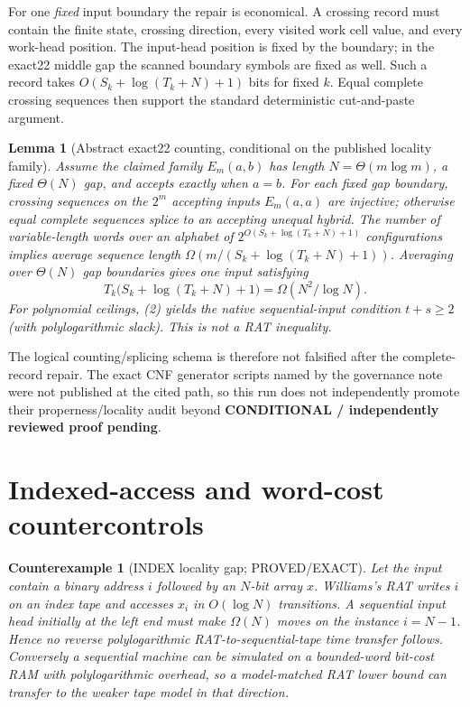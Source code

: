 \documentclass[11pt]{article}
\newtheorem{lemma}[theorem]{Lemma}
\newtheorem{counterexample}[theorem]{Counterexample}
\begin{document}
For one \emph{fixed} input boundary the repair is economical.  A crossing
record must contain the finite state, crossing direction, every visited work
cell value, and every work-head position.  The input-head position is fixed
by the boundary; in the exact22 middle gap the scanned boundary symbols are
fixed as well.  Such a record takes $O(S_k+\log(T_k+N)+1)$ bits for fixed $k$.
Equal complete crossing sequences then support the standard deterministic
cut-and-paste argument.

\begin{lemma}[Abstract exact22 counting, conditional on the published locality
family]
Assume the claimed family $E_m(a,b)$ has length $N=\Theta(m\log m)$, a fixed
$\Theta(N)$ gap, and accepts exactly when $a=b$.  For each fixed gap boundary,
crossing sequences on the $2^m$ accepting inputs $E_m(a,a)$ are injective;
otherwise equal complete sequences splice to an accepting unequal hybrid.
The number of variable-length words over an alphabet of
$2^{O(S_k+\log(T_k+N)+1)}$ configurations implies average sequence length
$\Omega(m/(S_k+\log(T_k+N)+1))$.  Averaging over $\Theta(N)$ gap boundaries
gives one input satisfying
\[
 T_k\bigl(S_k+\log(T_k+N)+1\bigr)=\Omega(N^2/\log N).
\tag{2}
\]
For polynomial ceilings, (2) yields the native sequential-input condition
$t+s\ge2$ (with polylogarithmic slack).  This is not a RAT inequality.
\end{lemma}

The logical counting/splicing schema is therefore not falsified after the
complete-record repair.  The exact CNF generator scripts named by the
governance note were not published at the cited path, so this run does not
independently promote their properness/locality audit beyond
\textbf{CONDITIONAL / independently reviewed proof pending}.

\section{Indexed-access and word-cost countercontrols}
\begin{counterexample}[INDEX locality gap; PROVED/EXACT]
Let the input contain a binary address $i$ followed by an $N$-bit array $x$.
Williams's RAT writes $i$ on an index tape and accesses $x_i$ in
$O(\log N)$ transitions.  A sequential input head initially at the left end
must make $\Omega(N)$ moves on the instance $i=N-1$.  Hence no reverse
polylogarithmic RAT-to-sequential-tape time transfer follows.  Conversely a
sequential machine can be simulated on a bounded-word bit-cost RAM with
polylogarithmic overhead, so a model-matched RAT lower bound can transfer to
the weaker tape model in that direction.
\end{counterexample}
\end{document}
